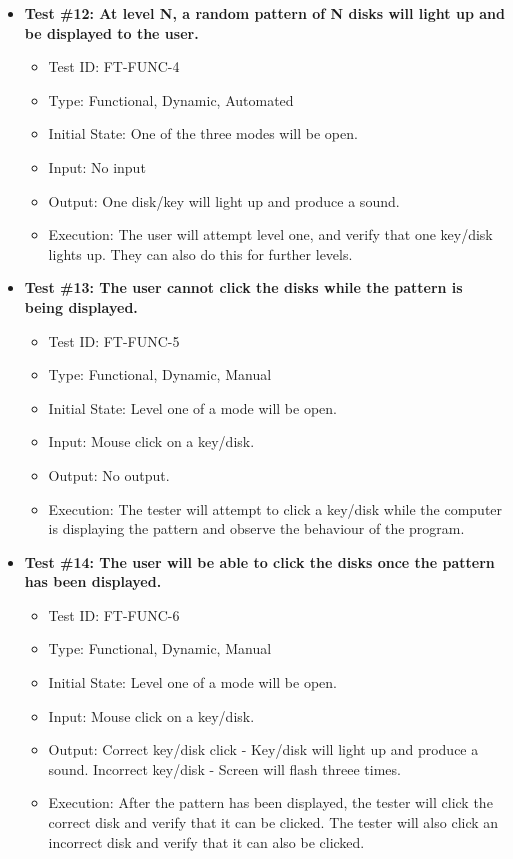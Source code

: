 \documentclass[12pt, titlepage]{article}
\begin{document}
\begin{itemize}
\item \textbf{Test \#12: At level N, a random pattern of N disks will light up and be displayed to the user. }
\begin{itemize}
\item Test ID: FT-FUNC-4
\item Type: Functional, Dynamic, Automated		
\item Initial State: One of the three modes will be open. 					
\item Input: No input				
\item Output: One disk/key will light up and produce a sound.		
\item Execution: The user will attempt level one, and verify that one key/disk lights up. They can also do this for further levels. 
\end{itemize}

\item \textbf{Test \#13: The user cannot click the disks while the pattern is being displayed.}
\begin{itemize}
\item Test ID: FT-FUNC-5
\item Type: Functional, Dynamic, Manual	
\item Initial State: Level one of a mode will be open.					
\item Input: Mouse click on a key/disk. 					
\item Output: No output. 					
\item Execution: The tester will attempt to click a key/disk while the computer is displaying the pattern and observe the behaviour of the program.
\end{itemize}

\item \textbf{Test \#14: The user will be able to click the disks once the pattern has been displayed.}
\begin{itemize}
\item Test ID: FT-FUNC-6
\item Type: Functional, Dynamic, Manual	
\item Initial State: Level one of a mode will be open.					
\item Input: Mouse click on a key/disk.					
\item Output: Correct key/disk click - Key/disk will light up and produce a sound. Incorrect key/disk - Screen will flash threee times. 					
\item Execution: After the pattern has been displayed, the tester will click the correct disk and verify that it can be clicked. The tester will also click an incorrect disk and verify that it can also be clicked.
\end{itemize}


\end{itemize}
\end{document}
